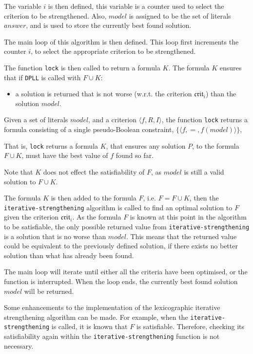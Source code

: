 The variable $i$ is then defined, this variable is a counter used to select the criterion to be strengthened.
Also, $model$ is assigned to be the set of literals $answer$, and is used to store the currently best found solution.

The main loop of this algorithm is then defined.
This loop first increments the counter $i$, to select the appropriate criterion to be strengthened.

The function \texttt{lock} is then called to return a formula $K$.
The formula $K$ ensures that if \texttt{DPLL} is called with $F \cup K$:
\begin{itemize}
  \item a solution is returned that is not worse (w.r.t. the criterion $\mathfrak{crit}_i$) than the solution $model$. 
\end{itemize}

\begin{defs}
Given a set of literals $model$, and a criterion $\langle f, R, I \rangle$,
the function \texttt{lock} returns a formula consisting of a single pseudo-Boolean constraint, $\{ \langle f,=,f(model) \rangle \}$,
\end{defs}
That is, \texttt{lock} returns a formula $K$,
that ensures any solution $P$, to the formula $F \cup K$, must have the best value of $f$ found so far.

Note that $K$ does not effect the satisfiability of $F$, as $model$ is still a valid solution to $F \cup K$.

The formula $K$ is then added to the formula $F$, i.e. $F = F \cup K$,
then the \texttt{iterative-strengthening} algorithm is called to find an optimal solution to $F$ given the criterion $\mathfrak{crit}_i$.
As the formula $F$ is known at this point in the algorithm to be satisfiable, the only possible returned value from \texttt{iterative-strengthening}
is a solution that is no worse than $model$.
This means that the returned value could be equivalent to the previously defined solution, if there exists no better solution than what has already been found.

The main loop will iterate until either all the criteria have been optimised, or the function is interrupted.
When the loop ends, the currently best found solution $model$ will be returned.

Some enhancements to the implementation of the lexicographic iterative strengthening algorithm can be made.
For example, when the \texttt{iterative-strengthening} is called, it is known that $F$ is satisfiable. 
Therefore, checking its satisfiability again within the \texttt{iterative-strengthening} function is not necessary.

